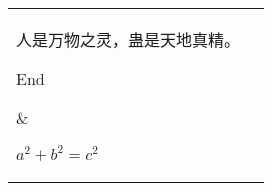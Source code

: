 \documentclass[hyperref,UTF8]{ctexart}
\begin{document}
\begin{table}
\centering
\begin{tabular}{|l|l|}
\hline 
	\parbox[c][3cm][t]{3cm} %
	{ %
		\rule{0pt}{12pt}%
		人是万物之灵，蛊是天地真精。

		End
	}
&
	\parbox[c][3cm][c]{3cm} {%
		\raggedright%
		$a^2+b^2=c^2$
	}
\\ 
\hline 
	\parbox[c][3cm][b]{3cm} {%
		\raggedleft%
		$a^2+b^2=c^2$
	}
&
	\parbox[c][3cm][c]{3cm} {%
		\centering%
		{$a^2+b^2=c^2$}
	}
\\
\hline
\end{tabular}
\end{table}
\end{document}
